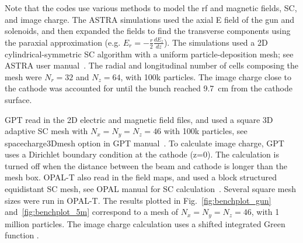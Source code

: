 Note that the codes use various methods to model 
the rf and magnetic fields, SC, and image charge. 
The ASTRA simulations used the axial E field of the  
gun and solenoids, and then expanded the fields to find the
transverse components using the paraxial approximation 
(e.g. $E_r=-\frac{r}{2}\frac{dE_z}{dz}$). 
The simulations used a 2D cylindrical-symmetric SC algorithm with a uniform  
particle-deposition mesh; see ASTRA user manual~\cite{astra}.
The radial and longitudinal number of cells composing the mesh 
were $N_r=32$ and $N_z=64$, with 100k particles.  
The image charge close to the cathode was accounted for until 
the bunch reached \SI{9.7}{cm} from the cathode surface. 

GPT read in the 2D electric and magnetic field files,  
and used a square 3D adaptive SC mesh with $N_x=N_y=N_z=46$
with 100k particles, see spacecharge3Dmesh option in GPT manual~\cite{gpt}.
To calculate image charge, GPT uses a Dirichlet boundary condition at the  
cathode (z=0). The calculation is turned off when the  
distance between the beam and cathode is longer than the 
mesh box. OPAL-T also read in the field maps, and used a block 
structured equidistant SC mesh, see OPAL manual for SC calculation~\cite{opal}.  
Several square mesh sizes were run in OPAL-T. The results plotted in 
Fig.~\ref{fig:benchplot_gun} and~\ref{fig:benchplot_5m} correspond to a mesh of $N_x=N_y=N_z=46$, with 1 million particles. 
The image charge calculation uses a 
shifted integrated Green function \cite{imagecharge}.  
